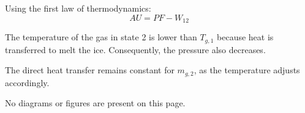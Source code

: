 Using the first law of thermodynamics:  
\[
AU = PF - W_{12}
\]  

The temperature of the gas in state 2 is lower than \( T_{g,1} \) because heat is transferred to melt the ice. Consequently, the pressure also decreases.  

The direct heat transfer remains constant for \( m_{g,2} \), as the temperature adjusts accordingly.  

No diagrams or figures are present on this page.